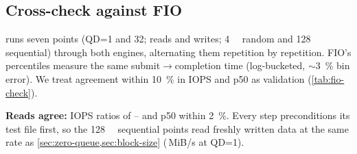 \subsection{Cross-check against FIO}\label{sec:fio-check}
 runs seven points (QD=1 and 32; reads and writes; \qty{4}{\kibi\byte} random and
\qty{128}{\kibi\byte} sequential) through both engines, alternating them repetition by repetition. FIO's
 percentiles measure the same submit$\to$completion time (log-bucketed, \ensuremath{\sim}\qty{3}{\percent}
bin error). We treat agreement within \qty{10}{\percent} in IOPS and p50 as validation
(\cref{tab:fio-check}).

\begin{table}[!htbp]
  \centering\small
  \caption{ vs.\ FIO on identical points (medians of 5 interleaved repetitions per
  engine; latencies in \si{\micro\second}).}\label{tab:fio-check}
\end{table}

\textbf{Reads agree:} IOPS ratios of
--%
 and p50 within \qty{2}{\percent}. Every
step preconditions its test file first, so the \qty{128}{\kibi\byte} sequential points read freshly
written data at the same rate as \cref{sec:zero-queue,sec:block-size}
(\,MiB/s at QD=1).

